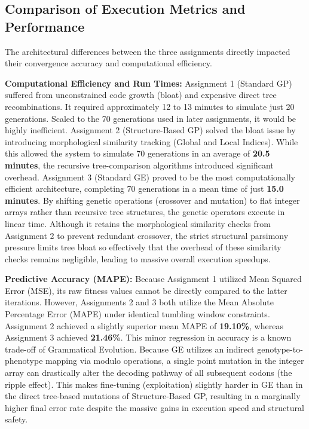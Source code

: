\documentclass[12pt]{article}
\begin{document}
    \subsection{Comparison of Execution Metrics and Performance}
        The architectural differences between the three assignments directly impacted their convergence accuracy and computational efficiency.
        
        \textbf{Computational Efficiency and Run Times:} 
        Assignment 1 (Standard GP) suffered from unconstrained code growth (bloat) and expensive direct tree recombinations. It required approximately 12 to 13 minutes to simulate just 20 generations. Scaled to the 70 generations used in later assignments, it would be highly inefficient.
        Assignment 2 (Structure-Based GP) solved the bloat issue by introducing morphological similarity tracking (Global and Local Indices). While this allowed the system to simulate 70 generations in an average of \textbf{20.5 minutes}, the recursive tree-comparison algorithms introduced significant overhead.
        Assignment 3 (Standard GE) proved to be the most computationally efficient architecture, completing 70 generations in a mean time of just \textbf{15.0 minutes}. By shifting genetic operations (crossover and mutation) to flat integer arrays rather than recursive tree structures, the genetic operators execute in linear time. Although it retains the morphological similarity checks from Assignment 2 to prevent redundant crossover, the strict structural parsimony pressure limits tree bloat so effectively that the overhead of these similarity checks remains negligible, leading to massive overall execution speedups.

        \textbf{Predictive Accuracy (MAPE):} 
        Because Assignment 1 utilized Mean Squared Error (MSE), its raw fitness values cannot be directly compared to the latter iterations. However, Assignments 2 and 3 both utilize the Mean Absolute Percentage Error (MAPE) under identical tumbling window constraints. 
        Assignment 2 achieved a slightly superior mean MAPE of \textbf{19.10\%}, whereas Assignment 3 achieved \textbf{21.46\%}. This minor regression in accuracy is a known trade-off of Grammatical Evolution. Because GE utilizes an indirect genotype-to-phenotype mapping via modulo operations, a single point mutation in the integer array can drastically alter the decoding pathway of all subsequent codons (the ripple effect). This makes fine-tuning (exploitation) slightly harder in GE than in the direct tree-based mutations of Structure-Based GP, resulting in a marginally higher final error rate despite the massive gains in execution speed and structural safety.
\end{document}
